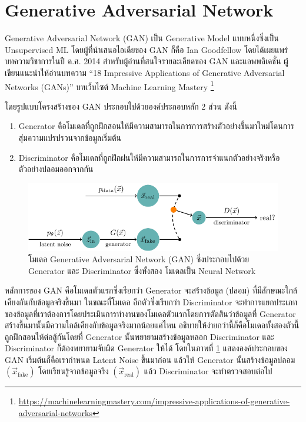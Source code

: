 \section{Generative Adversarial Network}
\label{sec:gan}

Generative Adversarial Network (GAN) เป็น Generative Model แบบหนึ่งซึ่งเป็น Unsupervised ML โดยผู้ที่นำเสนอไอเดียของ GAN 
ก็คือ Ian Goodfellow โดยได้เผยแพร่บทความวิชาการในปี ค.ศ. 2014\autocite{goodfellow2014b} สำหรับผู้อ่านที่สนใจรายละเอียดของ 
GAN และแอพพลิเคชั่น ผู้เขียนแนะนำให้อ่านบทความ \enquote{18 Impressive Applications of Generative Adversarial Networks 
(GANs)} บทเว็บไซต์ Machine Learning Mastery%
\footnote{\url{https://machinelearningmastery.com/impressive-applications-of-generative-adversarial-networks}}

\noindent โดยรูปแบบโครงสร้างของ GAN ประกอบไปด้วยองค์ประกอบหลัก 2 ส่วน ดังนี้

\begin{enumerate}
    \item Generator คือโมเดลที่ถูกฝึกสอนให้มีความสามารถในการการสร้างตัวอย่างขึ้นมาใหม่โดนการสุ่มความแปรปรวนจากข้อมูลเริ่มต้น
    \item Discriminator คือโมเดลที่ถูกฝึกฝนให้มีความสามารถในการการจำแนกตัวอย่างจริงหรือตัวอย่างปลอมออกจากกัน
\end{enumerate}

\begin{figure}[htbp]
    \includegraphics[width=\linewidth]{fig/generative_adversarial_nets.pdf}
    \caption{โมเดล Generative Adversarial Network (GAN) ซึ่งประกอบไปด้วย Generator และ Discriminator ซึ่งทั้งสอง%
    โมเดลเป็น Neural Network}
    \label{fig:gan}
\end{figure}

หลักการของ GAN คือโมเดลตัวแรกซึ่งเรียกว่า Generator จะสร้างข้อมูล (ปลอม) ที่มีลักษณะใกล้เคียงกันกับข้อมูลจริงขึ้นมา ในขณะที่โมเดล%
อีกตัวซึ่งเรีบกว่า Discriminator จะทำการแยกประเภทของข้อมูลที่เราต้องการโดยประเมินการทำงานของโมเดลตัวแรกโดยการตัดสินว่าข้อมูลที่ 
Generator สร้างขึ้นมานั้นมีความใกล้เคียงกับข้อมูลจริงมากน้อยแค่ไหน อธิบายให้ง่ายกว่านี้ก็คือโมเดลทั้งสองตัวนี้ถูกฝึกสอนให้ต่อสู้กันโดยที่
Generator นั้นพยายามสร้างข้อมูลหลอก Discriminator และ Discriminator ก็ต้องพยายามจับผิด Generator ให้ได้ โดยในภาพที่ 
\ref{fig:gan} แสดงองค์ประกอบของ GAN เริ่มต้นก็คือเรากำหนด Latent Noise ขึ้นมาก่อน แล้วให้ Generator นั้นสร้างข้อมูลปลอม 
$(\vec{x}_{\text{fake}})$ โดยเรียนรู้จากข้อมูลจริง $(\vec{x}_{\text{real}})$ แล้ว Discriminator จะทำตรวจสอบต่อไป

